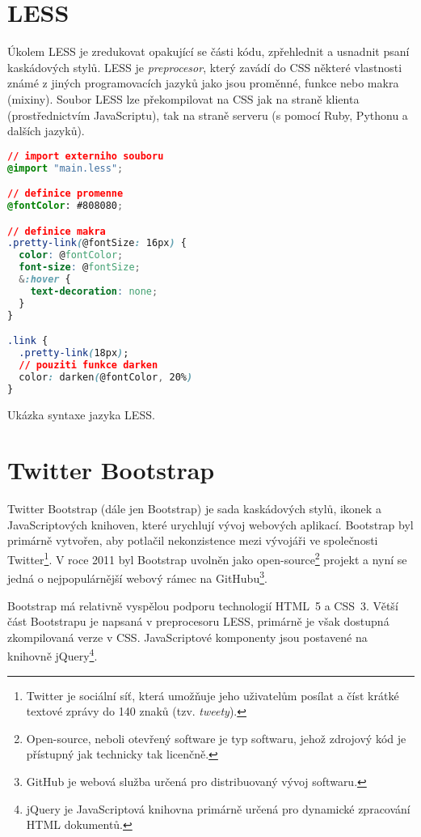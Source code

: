 \section{LESS}
\label{sec:less}

Úkolem LESS je zredukovat opakující se části kódu, zpřehlednit a usnadnit psaní kaskádových stylů. LESS je \textit{preprocesor}, který zavádí do CSS některé vlastnosti známé z jiných programovacích jazyků jako jsou proměnné, funkce nebo makra (mixiny). Soubor LESS lze překompilovat na CSS jak na straně klienta (prostřednictvím JavaScriptu), tak na straně serveru (s pomocí Ruby, Pythonu a dalších jazyků). \cite{18}

\begin{example}
    \centering
    \begin{lstlisting}[language=css]
// import externiho souboru
@import "main.less";

// definice promenne
@fontColor: #808080;

// definice makra
.pretty-link(@fontSize: 16px) {
  color: @fontColor;
  font-size: @fontSize;
  &:hover {
    text-decoration: none;
  }
}

.link {
  .pretty-link(18px);
  // pouziti funkce darken
  color: darken(@fontColor, 20%)
}
    \end{lstlisting}
    \caption{Ukázka syntaxe jazyka LESS.}
    \label{example:less-css}
\end{example}

\section{Twitter Bootstrap}
\label{sec:bootstrap}

Twitter Bootstrap (dále jen Bootstrap) je sada kaskádových stylů, ikonek a JavaScriptových knihoven, které urychlují vývoj webových aplikací. Bootstrap byl primárně vytvořen, aby potlačil nekonzistence mezi vývojáři ve společnosti Twitter\footnote{Twitter je sociální síť, která umožňuje jeho uživatelům posílat a číst krátké textové zprávy do 140 znaků (tzv. \textit{tweety}).}. V roce 2011 byl Bootstrap uvolněn jako open-source\footnote{Open-source, neboli otevřený software je typ softwaru, jehož zdrojový kód je přístupný jak technicky tak licenčně.} projekt a nyní se jedná o nejpopulárnější webový rámec na GitHubu\footnote{GitHub je webová služba určená pro distribuovaný vývoj softwaru.}. \cite{19}

Bootstrap má relativně vyspělou podporu technologií HTML~5 a CSS~3. Větší část Bootstrapu je napsaná v preprocesoru LESS, primárně je však dostupná zkompilovaná verze v CSS. JavaScriptové komponenty jsou postavené na knihovně jQuery\footnote{jQuery je JavaScriptová knihovna primárně určená pro dynamické zpracování HTML dokumentů.}.

